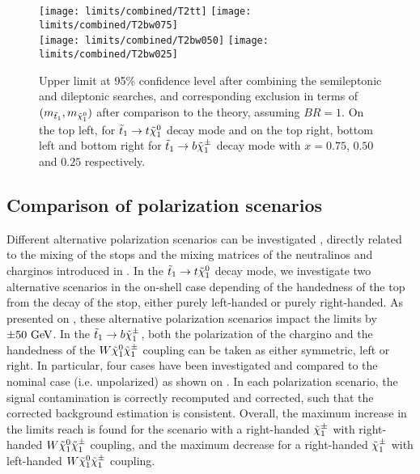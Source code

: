     \begin{figure}[h!]
        \centering
        \texttt{[image: limits/combined/T2tt]}
        \texttt{[image: limits/combined/T2bw075]}\\
        \texttt{[image: limits/combined/T2bw050]}
        \texttt{[image: limits/combined/T2bw025]}\\
        \caption{Upper limit at 95\% confidence level after combining the semileptonic
        and dileptonic searches, and corresponding exclusion in terms of $(m_{\tilde{t}_1},
        m_{\tilde{\chi}_1^0})$ after comparison to the theory, assuming
        $BR = 1$. On the top left, for $\tilde{t}_1 \rightarrow t \tilde{\chi}_1^0$ decay mode and on
        the top right, bottom left and bottom right for $\tilde{t}_1 \rightarrow b \tilde{\chi}_1^\pm$ decay
        mode with $x=0.75$, $0.50$ and $0.25$ respectively.}
        \label{fig:resultsCombined}
    \end{figure}

    \subsection{Comparison of polarization scenarios}

    Different alternative polarization scenarios can be investigated \cite{polarization1, polarization2}, directly related to the mixing of
    the stops and the mixing matrices of the neutralinos and charginos introduced in
    . In the
    $\tilde{t}_1 \rightarrow t \tilde{\chi}_1^0$ decay mode, we investigate two alternative scenarios
    in the on-shell case depending of the handedness of the top from the decay of the stop,
    either purely left-handed or purely right-handed. As presented on
    , these
    alternative polarization scenarios impact the limits by $\pm 50~\text{GeV}$. In the
    $\tilde{t}_1 \rightarrow b \tilde{\chi}_1^\pm$, both the polarization of the chargino and the
    handedness of the $W\tilde{\chi}_1^0\tilde{\chi}_1^\pm$ coupling can be taken as either symmetric,
    left or right. In particular, four cases have been investigated and compared to the
    nominal case (i.e. unpolarized) as shown on .
    In each polarization scenario, the signal contamination is correctly recomputed
    and corrected, such that the corrected background estimation is consistent. Overall, the
    maximum increase in the limits reach is found for the scenario with a right-handed
    $\tilde{\chi}_1^\pm$ with right-handed $W\tilde{\chi}_1^0\tilde{\chi}_1^\pm$ coupling, and the maximum
    decrease for a right-handed $\tilde{\chi}_1^\pm$ with left-handed $W\tilde{\chi}_1^0\tilde{\chi}_1^\pm$ coupling.

